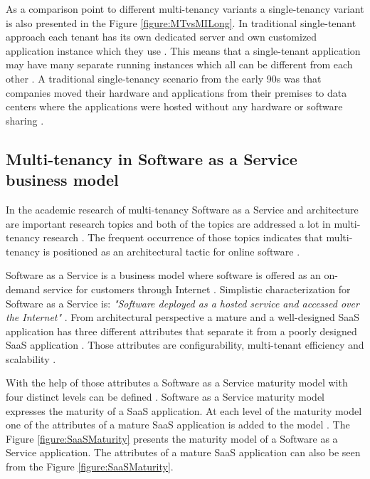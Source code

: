 \documentclass[conference]{sasmoota2017}
\begin{document}
As a comparison point to different multi-tenancy variants a single-tenancy variant is also presented in the Figure \ref{figure:MTvsMILong}. In traditional single-tenant approach each tenant has its own dedicated server and own customized application instance which they use \cite{Bezemer:2010:MaintenanceDream}. This means that a single-tenant application may have many separate running instances which all can be different from each other \cite{Bezemer:2010:MaintenanceDream}. A traditional single-tenancy scenario from the early 90s was that companies moved their hardware and applications from their premises to data centers where the applications were hosted without any hardware or software sharing \cite{Guo:2007:FrameworkForNative}. 

\subsection{Multi-tenancy in Software as a Service business model}

In the academic research of multi-tenancy Software as a Service and architecture are important research topics and both of the topics are addressed a lot in multi-tenancy research \cite{Kabbedijk2015:Defining}. The frequent occurrence of those topics indicates that multi-tenancy is positioned as an architectural tactic for online software \cite{Kabbedijk2015:Defining}. 

Software as a Service is a business model where software is offered as an on-demand service for customers through Internet \cite{Bezemer:2010:MaintenanceDream}. Simplistic characterization for Software as a Service is: \textit{"Software deployed as a hosted service and accessed over the Internet"} \cite{Carraro:2006:ArchitectureLongTail}. From architectural perspective a mature and a well-designed SaaS application has three different attributes that separate it from a poorly designed SaaS application \cite{Carraro:2006:ArchitectureLongTail}. Those attributes are configurability, multi-tenant efficiency and scalability \cite{Carraro:2006:ArchitectureLongTail}.

With the help of those attributes a Software as a Service maturity model with four distinct levels can be defined \cite{Carraro:2006:ArchitectureLongTail}. Software as a Service maturity model expresses the maturity of a SaaS application. At each level of the maturity model one of the attributes of a mature SaaS application is added to the model \cite{Carraro:2006:ArchitectureLongTail}. The Figure \ref{figure:SaaSMaturity} presents the maturity model of a Software as a Service application. The attributes of a mature SaaS application can also be seen from the Figure \ref{figure:SaaSMaturity}. 
\end{document}
